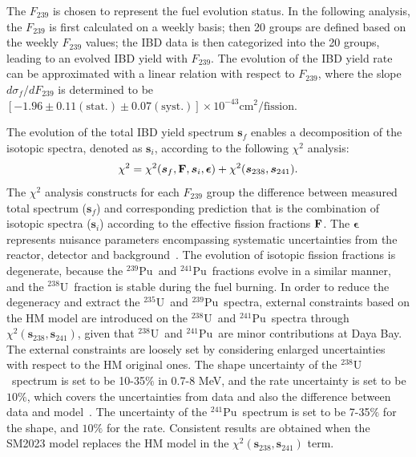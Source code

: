 \documentclass[aps,prl,showpacs,showkeys,amsmath,amssymb,twocolumn,floatfix,superscriptaddress,nofootinbib]{revtex4-1}
\newcommand{\Ufive}{$\mathrm{^{235}U}$}
\newcommand{\Ueight}{$\mathrm{^{238}U}$}
\newcommand{\Punine}{$\mathrm{^{239}Pu}$}
\newcommand{\Puone}{$\mathrm{^{241}Pu}$}
\begin{document}
The ${F}_{239}$ is chosen to represent the fuel evolution status.
In the following analysis, the ${F}_{239}$ is first calculated on a weekly basis;
then 20 groups are defined based on the weekly ${F}_{239}$ values;
the IBD data is then categorized into the 20 groups, leading to an evolved IBD yield with ${F}_{239}$.
The evolution of the IBD yield rate can be approximated with a linear relation with respect to $F_{239}$, where the slope ${d\sigma_{f}}/{dF_{239}}$ is determined to be $[-1.96\pm0.11\mathrm{(stat.)}\pm0.07\mathrm{(syst.)}] \times 10^{-43} \mathrm{cm^2/fission}$.










The evolution of the total IBD yield spectrum $\bm{s}_f$ enables a decomposition of the isotopic spectra, denoted as $\bm{s}_i$, according to the following $\chi^2$ analysis:
\begin{eqnarray}
\chi^2 = \chi^2(\bm{s}_f, {\bf F}, \bm{s}_i, \bm{\epsilon})  + \chi^2(\bm{s}_{238}, \bm{s}_{241}).
\label{eqSpecDecomp}
\end{eqnarray}
The $\chi^2$ analysis constructs for each $F_{239}$ group the difference between measured total spectrum ($\bm{s}_f$) and corresponding prediction that is the combination of isotopic spectra ($\bm{s}_i$) according to the effective fission fractions $\bf{F}$.
The $\bm{\epsilon}$ represents nuisance parameters encompassing systematic uncertainties from the reactor, detector and background~\cite{DayaBay_CPC_2016, DayaBay_PRD_flux2019, DayaBay_final_theta13}.
The evolution of isotopic fission fractions is degenerate, because the \Punine\ and \Puone\ fractions evolve in a similar manner, and the \Ueight\ fraction is stable during the fuel burning.
In order to reduce the degeneracy and extract the \Ufive\ and \Punine\ spectra, external constraints based on the HM model are introduced on the \Ueight\ and \Puone\ spectra through $\chi^2(\bm{s}_{238}, \bm{s}_{241})$, given that \Ueight\ and \Puone\ are minor contributions at Daya Bay.
The external constraints are loosely set by considering enlarged uncertainties with respect to the HM original ones.
The shape uncertainty of the \Ueight\ spectrum is set to be 10-35$\%$ in 0.7-8 MeV, and the rate uncertainty is set to be $10\%$, which covers the uncertainties from data and also the difference between data and model~\cite{Exp_U238}.
The uncertainty of the \Puone\ spectrum is set to be 7-35$\%$ for the shape, and $10\%$ for the rate.
Consistent results are obtained when the SM2023 model replaces the HM model in the $\chi^2(\bm{s}_{238}, \bm{s}_{241})$ term.
\end{document}

